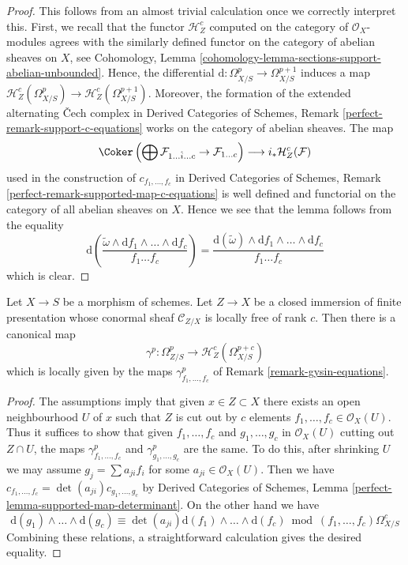 \begin{proof}
This follows from an almost trivial calculation once
we correctly interpret this. First, we recall that the functor
$\mathcal{H}^c_Z$ computed on the category of $\mathcal{O}_X$-modules
agrees with the similarly defined functor on the category of abelian
sheaves on $X$, see
Cohomology, Lemma \ref{cohomology-lemma-sections-support-abelian-unbounded}.
Hence, the differential $\text{d} : \Omega^p_{X/S} \to \Omega^{p + 1}_{X/S}$
induces a map
$\mathcal{H}^c_Z(\Omega^p_{X/S}) \to \mathcal{H}^c_Z(\Omega^{p + 1}_{X/S})$.
Moreover, the formation of the extended alternating {\v C}ech complex in
Derived Categories of Schemes, Remark \ref{perfect-remark-support-c-equations}
works on the category of abelian sheaves. The map
$$
\Coker\left(\bigoplus \mathcal{F}_{1 \ldots \hat i \ldots c} \to
\mathcal{F}_{1 \ldots c}\right)
\longrightarrow
i_*\mathcal{H}^c_Z(\mathcal{F})
$$
used in the construction of $c_{f_1, \ldots, f_c}$ in
Derived Categories of Schemes, Remark
\ref{perfect-remark-supported-map-c-equations}
is well defined and
functorial on the category of all abelian sheaves on $X$.
Hence we see that the lemma follows from the equality
$$
\text{d}\left(
\frac{\tilde \omega \wedge \text{d}f_1 \wedge \ldots \wedge
\text{d}f_c}{f_1 \ldots f_c}\right) =
\frac{\text{d}(\tilde \omega) \wedge
\text{d}f_1 \wedge \ldots \wedge \text{d}f_c}{f_1 \ldots f_c}
$$
which is clear.
\end{proof}

\begin{lemma}
\label{lemma-gysin-global}
Let $X \to S$ be a morphism of schemes. Let $Z \to X$ be a closed immersion
of finite presentation whose conormal sheaf $\mathcal{C}_{Z/X}$ is
locally free of rank $c$. Then there is a canonical map
$$
\gamma^p : \Omega^p_{Z/S} \to \mathcal{H}^c_Z(\Omega^{p + c}_{X/S})
$$
which is locally given by the maps $\gamma^p_{f_1, \ldots, f_c}$
of Remark \ref{remark-gysin-equations}.
\end{lemma}

\begin{proof}
The assumptions imply that given $x \in Z \subset X$ there exists an
open neighbourhood $U$ of $x$ such that $Z$ is cut out by $c$
elements $f_1, \ldots, f_c \in \mathcal{O}_X(U)$. Thus
it suffices to show that given $f_1, \ldots, f_c$ and
$g_1, \ldots, g_c$ in $\mathcal{O}_X(U)$ cutting out $Z \cap U$,
the maps $\gamma^p_{f_1, \ldots, f_c}$
and $\gamma^p_{g_1, \ldots, g_c}$ are the same. To do this, after shrinking
$U$ we may assume $g_j = \sum a_{ji} f_i$ for some
$a_{ji} \in \mathcal{O}_X(U)$. Then we have
$c_{f_1, \ldots, f_c} = \det(a_{ji}) c_{g_1, \ldots, g_c}$ by
Derived Categories of Schemes, Lemma
\ref{perfect-lemma-supported-map-determinant}.
On the other hand we have
$$
\text{d}(g_1) \wedge \ldots \wedge \text{d}(g_c) \equiv
\det(a_{ji}) \text{d}(f_1) \wedge \ldots \wedge \text{d}(f_c)
\bmod (f_1, \ldots, f_c)\Omega^c_{X/S}
$$
Combining these relations, a straightforward calculation gives the
desired equality.
\end{proof}

